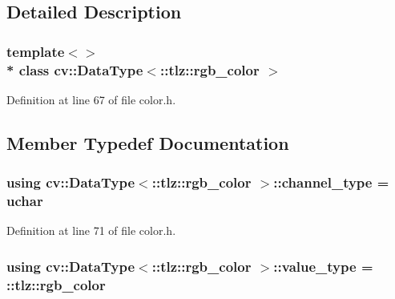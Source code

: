 \subsection{Detailed Description}
\subsubsection*{template$<$$>$\\*
class cv\+::\+Data\+Type$<$\+::tlz\+::rgb\+\_\+color $>$}



Definition at line 67 of file color.\+h.



\subsection{Member Typedef Documentation}
\subsubsection[{\texorpdfstring{channel\+\_\+type}{channel_type}}]{\setlength{\rightskip}{0pt plus 5cm}using cv\+::\+Data\+Type$<$\+::{\bf tlz\+::rgb\+\_\+color} $>$\+::{\bf channel\+\_\+type} =  uchar}\hypertarget{classcv_1_1DataType_3_1_1tlz_1_1rgb__color_01_4_a6aa02cb33c2609e58a8b93ecafb97056}{}\label{classcv_1_1DataType_3_1_1tlz_1_1rgb__color_01_4_a6aa02cb33c2609e58a8b93ecafb97056}


Definition at line 71 of file color.\+h.

\subsubsection[{\texorpdfstring{value\+\_\+type}{value_type}}]{\setlength{\rightskip}{0pt plus 5cm}using cv\+::\+Data\+Type$<$\+::{\bf tlz\+::rgb\+\_\+color} $>$\+::{\bf value\+\_\+type} =  \+::{\bf tlz\+::rgb\+\_\+color}}\hypertarget{classcv_1_1DataType_3_1_1tlz_1_1rgb__color_01_4_a53e9040d6acd2c82bd7b27843033911c}{}\label{classcv_1_1DataType_3_1_1tlz_1_1rgb__color_01_4_a53e9040d6acd2c82bd7b27843033911c}


